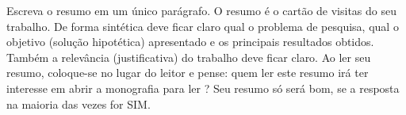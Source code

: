 Escreva o resumo em um único parágrafo. O resumo é o cartão de visitas do seu trabalho. De forma sintética deve ficar claro qual o problema de pesquisa, qual o objetivo (solução  hipotética) apresentado e os principais resultados obtidos. Também a relevância (justificativa) do trabalho deve ficar claro. Ao ler seu resumo, coloque-se no lugar do leitor e pense: quem ler este resumo irá ter interesse em abrir a monografia para ler ? Seu resumo só será bom, se a resposta na maioria das vezes for SIM.

